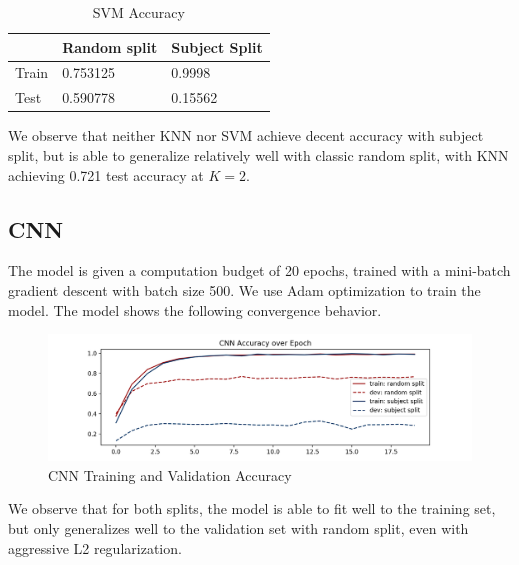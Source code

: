 \documentclass{article}
\begin{document}
\begin{multicols*}{2}
\vspace{-14px}

\begin{table}[H]
\centering
\begin{tabular}{lll}
\hline
      & Random split & Subject Split \\ \hline
Train & 0.753125     & 0.9998        \\
Test  & 0.590778     & 0.15562       \\ \hline
\end{tabular}
\vspace{3pt}
\caption{SVM Accuracy}
\label{tab:svm-acc}
\end{table}

\vspace{-11px}

We observe that neither KNN nor SVM achieve decent accuracy with subject split, but is able to generalize relatively well with classic random split, with KNN achieving 0.721 test accuracy at $K=2$.

\subsection{CNN}

The model is given a computation budget of 20 epochs, trained with a mini-batch gradient descent with batch size 500. We use Adam optimization\cite{adam} to train the model. The model shows the following convergence behavior.

\vspace{-10px}
\begin{figure}[H]
    \centering
    \includegraphics[scale=0.35]{cnn_acc.png}
    \caption{CNN Training and Validation Accuracy}
    \label{fig:cnn_train_acc_plot}
\end{figure}

\vspace{-12px}

We observe that for both splits, the model is able to fit well to the training set, but only generalizes well to the validation set with random split, even with aggressive L2 regularization. 


\end{multicols*}
\end{document}

